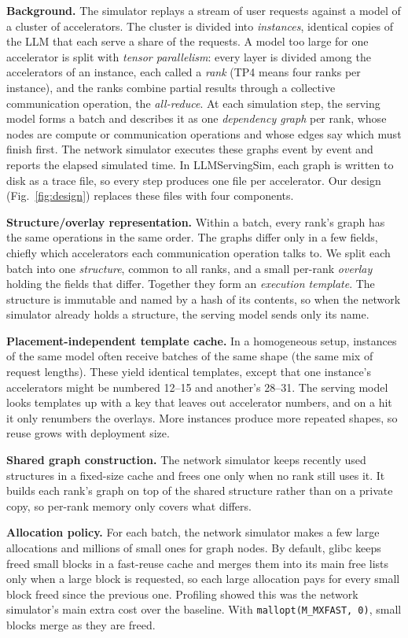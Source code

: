 \documentclass[conference]{IEEEtran}
\begin{document}
\textbf{Background.} The simulator replays a stream of user requests against a model of a cluster of
accelerators. The cluster
is divided into \emph{instances}, identical copies of the LLM that each
serve a share of the requests. A model too large for one accelerator is split
with \emph{tensor parallelism}: every layer is divided among the accelerators of
an instance, each called a \emph{rank} (TP4 means four ranks per
instance), and the ranks combine partial results through a collective communication
operation, the \emph{all-reduce}. At each simulation step, the serving
model forms a batch and describes it as one
\emph{dependency graph} per rank, whose nodes are compute or
communication operations and whose edges say which must finish first.
The network simulator executes these graphs event by event and reports
the elapsed simulated time. In LLMServingSim, each graph is written to
disk as a trace file, so every step produces one file per accelerator. Our design (Fig.~\ref{fig:design}) replaces these files with four components.

\textbf{Structure/overlay representation.} Within a batch, every rank's
graph has the same operations in the same order. The graphs differ only
in a few fields, chiefly which accelerators each communication operation talks
to. We split each batch into one \emph{structure}, common to all ranks,
and a small per-rank \emph{overlay} holding the fields that differ.
Together they form an \emph{execution template}. The structure is
immutable and named by a hash of its contents, so when the network
simulator already holds a structure, the serving model sends only its
name.

\textbf{Placement-independent template cache.} In a homogeneous setup, instances of the same
model often receive batches of the same shape (the same mix of request
lengths). These yield identical templates, except that one instance's
accelerators might be numbered 12--15 and another's 28--31. The serving model
looks templates up with a key that leaves out accelerator numbers, and
on a hit it only renumbers the overlays.
More instances produce more repeated
shapes, so reuse grows with deployment size.

\textbf{Shared graph construction.} The network simulator keeps recently
used structures in a fixed-size cache and frees one only when no rank still
uses it. It builds each rank's graph on top of the shared structure
rather than on a private copy, so per-rank memory only covers what differs.

\textbf{Allocation policy.} For each batch, the network simulator
makes a few large allocations and millions of small ones for graph
nodes. By default, glibc keeps freed small blocks in a fast-reuse cache
and merges them into its main free lists only when a large block is
requested, so each large allocation pays for every small block freed
since the previous one. Profiling showed this was the network
simulator's main extra cost over the baseline. With
\texttt{mallopt(M\_MXFAST,\,0)}, small blocks merge as they are freed.
\end{document}
